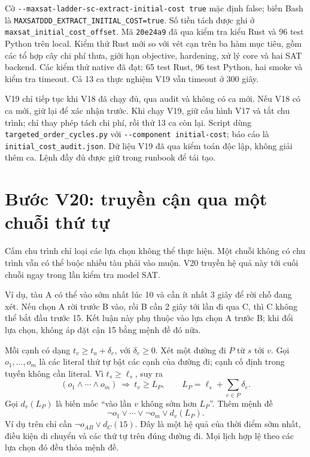 \documentclass[11pt,a4paper]{article}
\newcommand{\code}[1]{\texttt{#1}}
\newcommand{\file}[1]{\nolinkurl{#1}}
\begin{document}
Cờ \file{--maxsat-ladder-sc-extract-initial-cost true} mặc định false;
biến Bash là \file{MAXSATDDD_EXTRACT_INITIAL_COST=true}.
Số tiền tách được ghi ở \file{maxsat_initial_cost_offset}.
Mã \code{20e24a9} đã qua kiểm tra kiểu Rust và 96 test Python trên local.
Kiểm thử Rust mới so với vét cạn trên ba hàm mục tiêu, gồm các tổ hợp cây
chi phí thưa, giới hạn objective, hardening, xử lý core và hai SAT backend.
Các kiểm thử native đã đạt: 65 test Rust, 96 test Python, hai smoke và
kiểm tra timeout. Cả 13 ca thực nghiệm V19 vẫn timeout ở 300 giây.

V19 chỉ tiếp tục khi V18 đã chạy đủ, qua audit và không có ca mới.
Nếu V18 có ca mới, giữ lại để xác nhận trước. Khi chạy V19, giữ cấu hình
V17 và tắt chu trình; chỉ thay phép tách chi phí, rồi thử 13 ca còn lại.
Script dùng \file{targeted_order_cycles.py} với
\file{--component initial-cost}; báo cáo là \file{initial_cost_audit.json}.
Dữ liệu V19 đã qua kiểm toán độc lập, không giải thêm ca. Lệnh đầy đủ
được giữ trong runbook để tái tạo.

\section{Bước V20: truyền cận qua một chuỗi thứ tự}

Cấm chu trình chỉ loại các lựa chọn không thể thực hiện. Một chuỗi không
có chu trình vẫn có thể buộc nhiều tàu phải vào muộn. V20 truyền hệ quả
này tới cuối chuỗi ngay trong lần kiểm tra model SAT.

Ví dụ, tàu A có thể vào sớm nhất lúc 10 và cần ít nhất 3 giây để rời chỗ
đang xét. Nếu chọn A rời trước B vào, rồi B cần 2 giây tới lần đi qua C,
thì C không thể bắt đầu trước 15. Kết luận này phụ thuộc vào lựa chọn
A trước B; khi đổi lựa chọn, không áp đặt cận 15 bằng mệnh đề đó nữa.

Mỗi cạnh có dạng $t_v\geq t_u+\delta_e$, với $\delta_e\geq0$.
Xét một đường đi $P$ từ $s$ tới $v$. Gọi $o_1,\ldots,o_m$ là các literal
thứ tự bật các cạnh của đường đi; cạnh cố định trong tuyến không cần
literal. Vì $t_s\geq\ell_s$, suy ra
\[
 (o_1\land\cdots\land o_m)\ \Longrightarrow\
 t_v\geq L_P,\qquad L_P=\ell_s+\sum_{e\in P}\delta_e.
\]
Gọi $d_v(L_P)$ là biến mốc ``vào lần $v$ không sớm hơn $L_P$''. Thêm
mệnh đề
\[
 \neg o_1\lor\cdots\lor\neg o_m\lor d_v(L_P).
\]
Ví dụ trên chỉ cần $\neg o_{AB}\lor d_C(15)$. Đây là một hệ quả của
thời điểm sớm nhất, điều kiện di chuyển và các thứ tự trên đúng đường đi.
Mọi lịch hợp lệ theo các lựa chọn đó đều thỏa mệnh đề.
\end{document}
